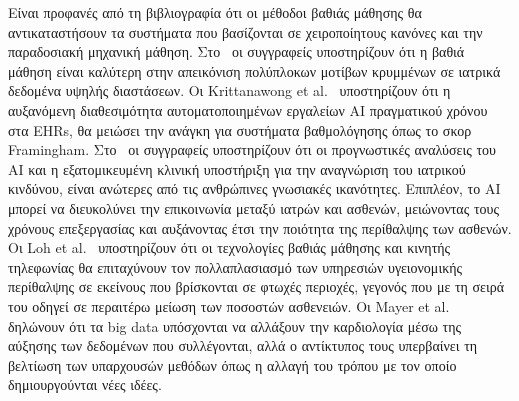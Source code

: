 Είναι προφανές από τη βιβλιογραφία ότι οι μέθοδοι βαθιάς μάθησης θα αντικαταστήσουν τα συστήματα που βασίζονται σε χειροποίητους κανόνες και την παραδοσιακή μηχανική μάθηση.
Στο~\cite{awan2018machine} οι συγγραφείς υποστηρίζουν ότι η βαθιά μάθηση είναι καλύτερη στην απεικόνιση πολύπλοκων μοτίβων κρυμμένων σε ιατρικά δεδομένα υψηλής διαστάσεων.
Οι Krittanawong et al.~\cite{krittanawong2017artificial} υποστηρίζουν ότι η αυξανόμενη διαθεσιμότητα αυτοματοποιημένων εργαλείων AI πραγματικού χρόνου στα EHRs, θα μειώσει την ανάγκη για συστήματα βαθμολόγησης όπως το σκορ Framingham.
Στο~\cite{krittanawong2017rise} οι συγγραφείς υποστηρίζουν ότι οι προγνωστικές αναλύσεις του AI και η εξατομικευμένη κλινική υποστήριξη για την αναγνώριση του ιατρικού κινδύνου, είναι ανώτερες από τις ανθρώπινες γνωσιακές ικανότητες.
Επιπλέον, το AI μπορεί να διευκολύνει την επικοινωνία μεταξύ ιατρών και ασθενών, μειώνοντας τους χρόνους επεξεργασίας και αυξάνοντας έτσι την ποιότητα της περίθαλψης των ασθενών.
Οι Loh et al.~\cite{loh2017deep} υποστηρίζουν ότι οι τεχνολογίες βαθιάς μάθησης και κινητής τηλεφωνίας θα επιταχύνουν τον πολλαπλασιασμό των υπηρεσιών υγειονομικής περίθαλψης σε εκείνους που βρίσκονται σε φτωχές περιοχές, γεγονός που με τη σειρά του οδηγεί σε περαιτέρω μείωση των ποσοστών ασθενειών.
Οι Mayer et al.~\cite{mayer2015big} δηλώνουν ότι τα big data υπόσχονται να αλλάξουν την καρδιολογία μέσω της αύξησης των δεδομένων που συλλέγονται, αλλά ο αντίκτυπος τους υπερβαίνει τη βελτίωση των υπαρχουσών μεθόδων όπως η αλλαγή του τρόπου με τον οποίο δημιουργούνται νέες ιδέες.

